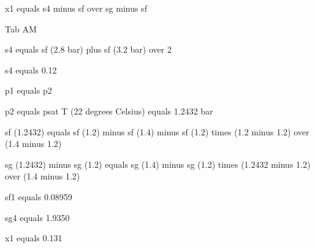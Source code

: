 x1 equals s4 minus sf over sg minus sf

Tab AM

s4 equals sf (2.8 bar) plus sf (3.2 bar) over 2

s4 equals 0.12

p1 equals p2

p2 equals psat T (22 degrees Celsius) equals 1.2432 bar

sf (1.2432) equals sf (1.2) minus sf (1.4) minus sf (1.2) times (1.2 minus 1.2) over (1.4 minus 1.2)

sg (1.2432) minus sg (1.2) equals sg (1.4) minus sg (1.2) times (1.2432 minus 1.2) over (1.4 minus 1.2)

sf1 equals 0.08959

sg4 equals 1.9350

x1 equals 0.131